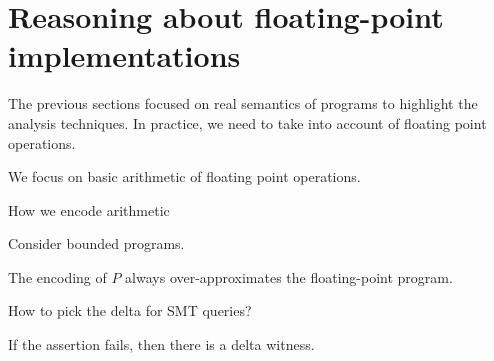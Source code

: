 \section{Reasoning about floating-point implementations}

The previous sections focused on real semantics of programs to highlight the analysis techniques. In practice, we need to take into account of floating point operations. 

We focus on basic arithmetic of floating point operations. 
\begin{definition}
How we encode arithmetic
\end{definition}

Consider bounded programs. 

\begin{proposition}
The encoding of $P$ always over-approximates the floating-point program. 
\end{proposition}

How to pick the delta for SMT queries?

\begin{proposition}
If the assertion fails, then there is a delta witness. 
\end{proposition}


